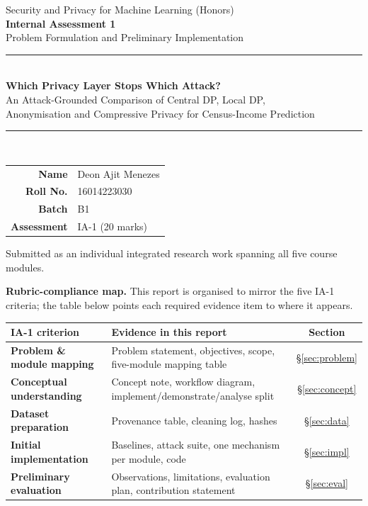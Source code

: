 \documentclass[11pt,a4paper]{article}
\begin{document}
\begin{titlepage}
\centering
\vspace*{1.2cm}
{\large Security and Privacy for Machine Learning (Honors)}\\[0.3cm]
{\large\bfseries Internal Assessment 1}\\[0.2cm]
{\normalsize Problem Formulation and Preliminary Implementation}\\[1.6cm]
\rule{\textwidth}{0.4pt}\\[0.5cm]
{\LARGE\bfseries Which Privacy Layer Stops Which Attack?}\\[0.4cm]
{\large An Attack-Grounded Comparison of Central DP, Local DP,\\
Anonymisation and Compressive Privacy for Census-Income Prediction}\\[0.5cm]
\rule{\textwidth}{0.4pt}\\[2.2cm]
\begin{tabular}{rl}
\textbf{Name} & Deon Ajit Menezes\\[4pt]
\textbf{Roll No.} & 16014223030\\[4pt]
\textbf{Batch} & B1\\[4pt]
\textbf{Assessment} & IA-1 (20 marks)\\
\end{tabular}
\vfill
{\small Submitted as an individual integrated research work spanning all five course modules.}
\end{titlepage}

\tableofcontents
\vspace{0.6cm}

\begin{shaded}
\noindent\textbf{Rubric-compliance map.} This report is organised to mirror the five IA-1
criteria; the table below points each required evidence item to where it appears.
\end{shaded}
\begin{center}\small
\begin{tabularx}{\textwidth}{>{\bfseries}p{3.2cm}Yc}
\toprule
IA-1 criterion & Evidence in this report & Section\\
\midrule
Problem \& module mapping & Problem statement, objectives, scope, five-module mapping table & \S\ref{sec:problem}\\
Conceptual understanding & Concept note, workflow diagram, implement/demonstrate/analyse split & \S\ref{sec:concept}\\
Dataset preparation & Provenance table, cleaning log, hashes & \S\ref{sec:data}\\
Initial implementation & Baselines, attack suite, one mechanism per module, code & \S\ref{sec:impl}\\
Preliminary evaluation & Observations, limitations, evaluation plan, contribution statement & \S\ref{sec:eval}\\
\bottomrule
\end{tabularx}
\end{center}
\end{document}
